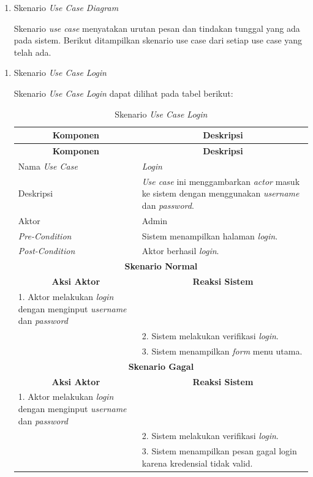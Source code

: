 \begin{enumerate}
    \item Skenario\textit{ Use Case Diagram}
\par Skenario \textit{use case} menyatakan urutan pesan dan tindakan tunggal yang ada pada sistem. Berikut ditampilkan skenario use case dari setiap use case yang telah ada.
\end{enumerate}
\begin{enumerate}[label=\alph*.]
    \item Skenario \textit{Use Case Login}
	\par Skenario \textit{Use Case Login} dapat dilihat pada tabel berikut:

        \begin{longtable}{|p{5cm}|p{9cm}|}
	    \caption{Skenario \textit{Use Case Login}}
	    \label{tab:my-table} \\ \hline
	    \multicolumn{1}{|c|}{\textbf{Komponen}} & \multicolumn{1}{c|}{\textbf{Deskripsi}} \\ \hline
	    \endfirsthead
	    \hline
	    \multicolumn{1}{|c|}{\textbf{Komponen}} & \multicolumn{1}{c|}{\textbf{Deskripsi}} \\ \hline
	    \endhead
	    Nama \textit{Use Case} & \textit{Login} \\ \hline
	    Deskripsi & \textit{Use case} ini menggambarkan \textit{actor} masuk ke sistem dengan menggunakan \textit{username} dan \textit{password}. \\ \hline
	    Aktor & Admin \\ \hline
	    \textit{Pre-Condition} & Sistem menampilkan halaman \textit{login}. \\ \hline
	    \textit{Post-Condition} & Aktor berhasil \textit{login}. \\ \hline
	    \multicolumn{2}{|c|}{\textbf{Skenario Normal}} \\ \hline
	    \multicolumn{1}{|c|}{\textbf{Aksi Aktor}} & \multicolumn{1}{c|}{\textbf{Reaksi Sistem}} \\ \hline
	    1. Aktor melakukan \textit{login} dengan menginput \textit{username} dan \textit{password} & \\ \hline
	    & 2. Sistem melakukan verifikasi \textit{login}. \\ \hline
	    & 3. Sistem menampilkan \textit{form} menu utama. \\ \hline
	    \multicolumn{2}{|c|}{\textbf{Skenario Gagal}} \\ \hline
	    \multicolumn{1}{|c|}{\textbf{Aksi Aktor}} & \multicolumn{1}{c|}{\textbf{Reaksi Sistem}} \\ \hline
	    1. Aktor melakukan \textit{login} dengan menginput \textit{username} dan \textit{password} & \\ \hline
	    & 2. Sistem melakukan verifikasi \textit{login}. \\ \hline
	    & 3. Sistem menampilkan pesan gagal login karena kredensial tidak valid. \\ \hline
	\end{longtable}



\end{enumerate}
